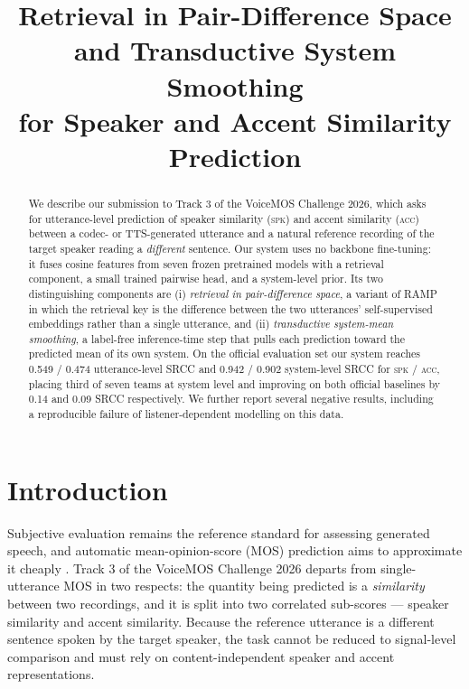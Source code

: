 \documentclass{article}
\title{Retrieval in Pair-Difference Space and Transductive System Smoothing \\
       for Speaker and Accent Similarity Prediction}
\begin{document}
\maketitle

\begin{abstract}
We describe our submission to Track 3 of the VoiceMOS Challenge 2026, which asks
for utterance-level prediction of speaker similarity (\textsc{spk}) and accent
similarity (\textsc{acc}) between a codec- or TTS-generated utterance and a
natural reference recording of the target speaker reading a \emph{different}
sentence. Our system uses no backbone fine-tuning: it fuses cosine features from
seven frozen pretrained models with a retrieval component, a small trained
pairwise head, and a system-level prior. Its two distinguishing components are
(i) \emph{retrieval in pair-difference space}, a variant of RAMP in which the
retrieval key is the difference between the two utterances' self-supervised
embeddings rather than a single utterance, and (ii) \emph{transductive
system-mean smoothing}, a label-free inference-time step that pulls each
prediction toward the predicted mean of its own system. On the official
evaluation set our system reaches 0.549 / 0.474 utterance-level SRCC and
0.942 / 0.902 system-level SRCC for \textsc{spk} / \textsc{acc}, placing third
of seven teams at system level and improving on both official baselines by
0.14 and 0.09 SRCC respectively. We further report several negative results,
including a reproducible failure of listener-dependent modelling on this data.
\end{abstract}


\section{Introduction}

Subjective evaluation remains the reference standard for assessing generated
speech, and automatic mean-opinion-score (MOS) prediction aims to approximate it
cheaply \cite{utmos,mosbench}. Track 3 of the VoiceMOS Challenge 2026
\cite{codecmos} departs from single-utterance MOS in two respects: the quantity
being predicted is a \emph{similarity} between two recordings, and it is split
into two correlated sub-scores --- speaker similarity and accent similarity.
Because the reference utterance is a different sentence spoken by the target
speaker, the task cannot be reduced to signal-level comparison and must rely on
content-independent speaker and accent representations.
\end{document}

